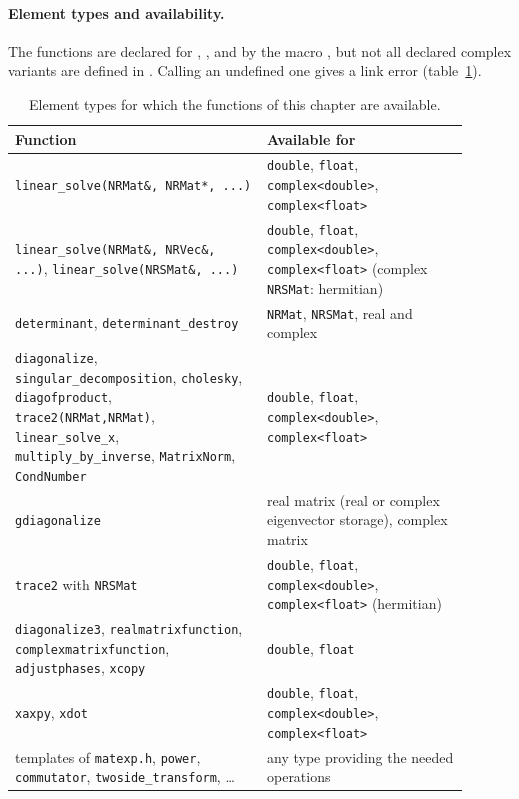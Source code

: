 \paragraph{Element types and availability.} The functions are declared for , ,
 and  by the macro , but not all declared complex variants are
defined in . Calling an undefined one gives a link error
(table~\ref{tab:nonclass:avail}).
\begin{table}[htbp]
\centering\small
\begin{tabular}{>{\raggedright\arraybackslash}p{0.5\linewidth}>{\raggedright\arraybackslash}p{0.4\linewidth}}
\toprule
Function & Available for \\
\midrule
\texttt{linear\_solve(NRMat\&, NRMat*, ...)} & \texttt{double}, \texttt{float}, \texttt{complex<double>}, \texttt{complex<float>} \\
\texttt{linear\_solve(NRMat\&, NRVec\&, ...)}, \texttt{linear\_solve(NRSMat\&, ...)} & \texttt{double}, \texttt{float}, \texttt{complex<double>}, \texttt{complex<float>} (complex \texttt{NRSMat}: hermitian) \\
\texttt{determinant}, \texttt{determinant\_destroy} & \texttt{NRMat}, \texttt{NRSMat}, real and complex \\
\texttt{diagonalize}, \texttt{singular\_decomposition}, \texttt{cholesky}, \texttt{diagofproduct},
\texttt{trace2(NRMat,NRMat)}, \texttt{linear\_solve\_x}, \texttt{multiply\_by\_inverse}, \texttt{MatrixNorm}, \texttt{CondNumber} & \texttt{double}, \texttt{float}, \texttt{complex<double>}, \texttt{complex<float>} \\
\texttt{gdiagonalize} & real matrix (real or complex eigenvector storage), complex matrix \\
\texttt{trace2} with \texttt{NRSMat} & \texttt{double}, \texttt{float}, \texttt{complex<double>}, \texttt{complex<float>} (hermitian) \\
\texttt{diagonalize3}, \texttt{realmatrixfunction}, \texttt{complexmatrixfunction},
\texttt{adjustphases}, \texttt{xcopy} & \texttt{double}, \texttt{float} \\
\texttt{xaxpy}, \texttt{xdot} & \texttt{double}, \texttt{float}, \texttt{complex<double>}, \texttt{complex<float>} \\
templates of \texttt{matexp.h}, \texttt{power}, \texttt{commutator}, \texttt{twoside\_transform}, \dots & any type providing the needed operations \\
\bottomrule
\end{tabular}
\caption{Element types for which the functions of this chapter are available.}\label{tab:nonclass:avail}
\end{table}

